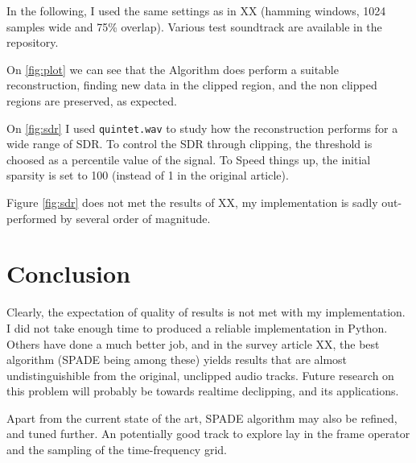 \documentclass[twocolumn]{scrartcl}
\begin{document}
In the following, I used the same settings as in XX (hamming windows, 1024 samples wide and 75\% overlap). Various test soundtrack are available in the repository.

On \ref{fig:plot} we can see that the Algorithm does perform a suitable reconstruction, finding new data in the clipped region, and the non clipped regions are preserved, as expected.

On \ref{fig:sdr} I used \texttt{quintet.wav} to study how the reconstruction performs for a wide range of SDR.
To control the SDR through clipping, the threshold is choosed as a percentile value of the signal. To Speed things up, the initial sparsity is set to 100 (instead of 1 in the original article).

Figure \ref{fig:sdr} does not met the results of XX, my implementation is sadly out-performed by several order of magnitude.

\section{Conclusion}

Clearly, the expectation of quality of results is not met with my implementation. I did not take enough time to produced a reliable implementation in Python. Others have done a much better job, and in the survey article XX,  the best algorithm (SPADE being among these) yields results that are almost undistinguishible from the original, unclipped audio tracks. Future research on this problem will probably be towards realtime declipping, and its applications.

Apart from the current state of the art, SPADE algorithm may also be refined, and tuned further. An potentially good track to explore lay in the frame operator and the sampling of the time-frequency grid.

\nocite{*}
\printbibliography
\end{document}

